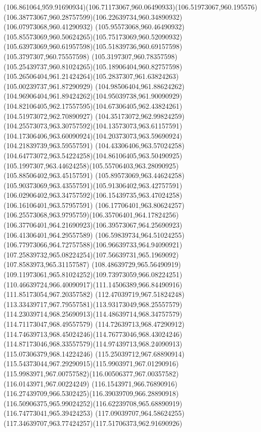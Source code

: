 {{  \curveto(106.861064,959.91690934)(106.71173067,960.06490933)(106.51973067,960.195576)
  \curveto(106.38773067,960.28757599)(106.22639734,960.34890932)(106.07973068,960.41290932)
  \curveto(105.95573068,960.46490932)(105.85573069,960.50624265)(105.75173069,960.52090932)
  \curveto(105.63973069,960.61957598)(105.51839736,960.69157598)(105.3797307,960.75557598)
  \curveto(105.3197307,960.78357598)(105.25439737,960.81024265)(105.18906404,960.82757598)
  \curveto(105.26506404,961.21424264)(105.2837307,961.63824263)(105.00239737,961.87290929)
  \curveto(104.98506404,961.88624262)(104.96906404,961.89424262)(104.95039738,961.90090929)
  \curveto(104.82106405,962.17557595)(104.67306405,962.43824261)(104.51973072,962.70890927)
  \curveto(104.35173072,962.99824259)(104.25573073,963.30757592)(104.13573073,963.61157591)
  \curveto(104.17306406,963.60090924)(104.20373073,963.59690924)(104.21839739,963.59557591)
  \curveto(104.43306406,963.57024258)(104.64773072,963.54224258)(104.86106405,963.50490925)
  \curveto(105.1997307,963.44624258)(105.55706403,963.28090925)(105.88506402,963.45157591)
  \curveto(105.89573069,963.44624258)(105.90373069,963.43557591)(105.91306402,963.42757591)
  \curveto(106.02906402,963.34757592)(106.15439735,963.47024258)(106.16106401,963.57957591)
  \curveto(106.17706401,963.80624257)(106.25573068,963.9795759)(106.35706401,964.17824256)
  \curveto(106.37706401,964.21690923)(106.39573067,964.25690923)(106.41306401,964.29557589)
  \curveto(106.59839734,964.51024255)(106.77973066,964.72757588)(106.96639733,964.94090921)
  \curveto(107.25839732,965.08224254)(107.56639731,965.1969092)(107.8583973,965.31157587)
  \curveto(108.48639729,965.56490919)(109.11973061,965.81024252)(109.73973059,966.08224251)
  \curveto(110.46639724,966.40090917)(111.14506389,966.84490916)(111.85173054,967.20357582)
  \curveto(112.47039719,967.51824248)(113.33439717,967.79557581)(113.93173049,968.25557579)
  \curveto(114.23039714,968.25690913)(114.48639714,968.34757579)(114.71173047,968.49557579)
  \curveto(114.72639713,968.47290912)(114.74639713,968.45024246)(114.76773046,968.43024246)
  \curveto(114.87173046,968.33557579)(114.97439713,968.24090913)(115.07306379,968.14224246)
  \curveto(115.25039712,967.68890914)(115.54373044,967.29290915)(115.9903971,967.01290916)
  \curveto(115.9983971,967.00757582)(116.00506377,967.00357582)(116.0143971,967.00224249)
  \curveto(116.1543971,966.76890916)(116.27439709,966.5302425)(116.39039709,966.28890918)
  \curveto(116.50906375,965.99024252)(116.62239708,965.68890919)(116.74773041,965.39424253)
  \curveto(117.09039707,964.58624255)(117.34639707,963.77424257)(117.51706373,962.91690926)
}}
